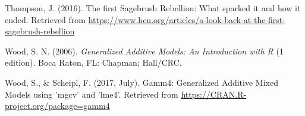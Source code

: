 \documentclass[12pt,twoside]{reedthesis}
\begin{document}
  \hypertarget{ref-thompson_first_2016}{}
  Thompson, J. (2016). The first Sagebrush Rebellion: What sparked it and
  how it ended. Retrieved from
  \url{https://www.hcn.org/articles/a-look-back-at-the-first-sagebrush-rebellion}
  
  \hypertarget{ref-wood_generalized_2006}{}
  Wood, S. N. (2006). \emph{Generalized Additive Models: An Introduction
  with R} (1 edition). Boca Raton, FL: Chapman; Hall/CRC.
  
  \hypertarget{ref-wood_gamm4:_2017}{}
  Wood, S., \& Scheipl, F. (2017, July). Gamm4: Generalized Additive Mixed
  Models using 'mgcv' and 'lme4'. Retrieved from
  \url{https://CRAN.R-project.org/package=gamm4}


\end{document}
